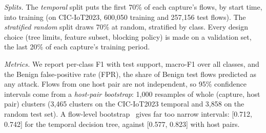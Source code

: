 \emph{Splits.} The \emph{temporal} split puts the first 70\% of each capture's flows, by start time, into training (on CIC-IoT2023, 600,050 training and 257,156 test flows). The \emph{stratified random} split draws 70\% at random, stratified by class. Every design choice (tree limits, feature subset, blocking policy) is made on a validation set, the last 20\% of each capture's training period.

\emph{Metrics.} We report per-class F1 with test support, macro-F1 over all classes, and the Benign false-positive rate (FPR), the share of Benign test flows predicted as any attack. Flows from one host pair are not independent, so 95\% confidence intervals come from a \emph{host-pair bootstrap}: 1,000 resamples of whole (capture, host pair) clusters (3,465 clusters on the CIC-IoT2023 temporal and 3,858 on the random test set). A flow-level bootstrap~\cite{efron1994bootstrap} gives far too narrow intervals: [0.712, 0.742] for the temporal decision tree, against [0.577, 0.823] with host pairs.
